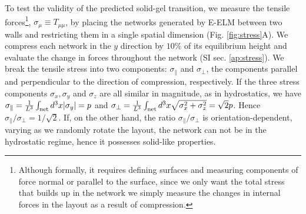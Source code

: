 \documentclass[nofootinbib,preprint,floatfix,titlepage,endfloats]{revtex4} %
\begin{document}
To test the validity of the predicted solid-gel transition, %
we measure the tensile forces\footnote{Although formally, it requires defining surfaces and measuring components of force normal or parallel to the surface, since we only want the total stress that builds up in the network we simply measure the changes in internal forces in the layout as a result of compression.}, $ \sigma_\mu \equiv T_{\mu\mu}$, by placing the networks generated by E-ELM between two walls and restricting them in a single spatial dimension (Fig. \ref{fig:stress}A). We compress each network in the $y$ direction by $10\%$ of its equilibrium height and evaluate the change in forces throughout the network (SI sec. \ref{ap:stress}). 
We break the tensile stress into two components: $\sigma_\parallel$ and $\sigma_\perp$, the components parallel and perpendicular to the direction of compression, respectively.  
If the three stress components $\sigma_x, \sigma_y$ and $\sigma_z$ are all similar in magnitude, as in hydrostatics, we have $ \sigma_\parallel ={1\over L^3} \int_\mathrm{net} d^3x |\sigma_y| = p$ and $\sigma_\perp = {1\over L^3} \int_\mathrm{net} d^3x \sqrt{\sigma_x^2+ \sigma_z^2} = \sqrt{2} p$.
Hence $ \sigma_\parallel/\sigma_\perp = 1/\sqrt{2}$. 
If, on the other hand, the ratio $ \sigma_\parallel/\sigma_\perp$ is orientation-dependent, varying as we randomly rotate the layout, the network %
can not be in the hydrostatic regime, hence it possesses solid-like properties. 
\end{document}
